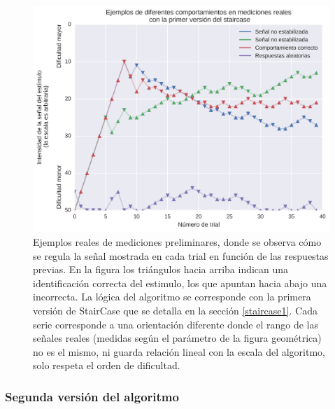 \documentclass{article}
\numberwithin{figure}{section}
\begin{document}
    \begin{figure}
        \center
        \includegraphics[width=\textwidth]{Imagenes/StairCase1.png}
        \caption{Ejemplos reales de mediciones preliminares, donde se observa cómo se regula la señal mostrada en cada trial en función de las respuestas previas. En la figura los triángulos hacia arriba indican una identificación correcta del estimulo, los que apuntan hacia abajo una incorrecta. La lógica del algoritmo se corresponde con la primera versión de StairCase que se detalla en la sección \ref{staircase1}. Cada serie corresponde a una orientación diferente donde el rango de las señales reales (medidas según el parámetro de la figura geométrica) no es el mismo, ni guarda relación lineal con la escala del algoritmo, solo respeta el orden de dificultad.}
        \label{fig:staircase1}
    \end{figure}    

    \subsubsection{Segunda versión del algoritmo} \label{staircase2}
    
\end{document}
